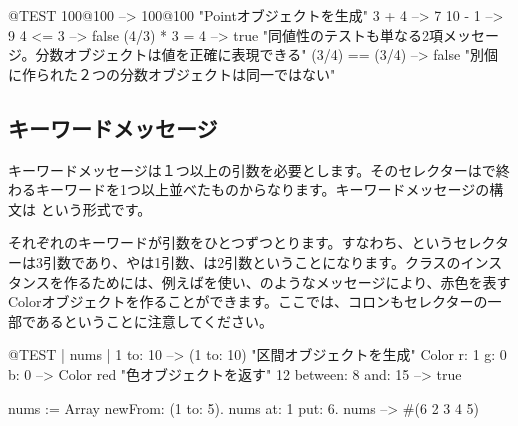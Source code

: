 \documentclass[a4paper,10pt,twoside]{book}
\begin{document}
\begin{code}{@TEST}
100@100      --> 100@100  "Pointオブジェクトを生成"
3 + 4              --> 7
10 - 1            --> 9
4 <= 3            --> false
(4/3) * 3 = 4   --> true  "同値性のテストも単なる2項メッセージ。分数オブジェクトは値を正確に表現できる"
(3/4) == (3/4) --> false  "別個に作られた２つの分数オブジェクトは同一ではない"
\end{code}


\subsection{キーワードメッセージ} 

キーワードメッセージは１つ以上の引数を必要とします。そのセレクターは\ct{:}で終わるキーワードを1つ以上並べたものからなります。キーワードメッセージの構文は
という形式です。

それぞれのキーワードが引数をひとつずつとります。すなわち、というセレクターは3引数であり、やは1引数、は2引数ということになります。クラスのインスタンスを作るためには、例えばを使い、のようなメッセージにより、赤色を表すColorオブジェクトを作ることができます。ここでは、コロンもセレクターの一部であるということに注意してください。


\begin{code}{@TEST | nums |}
1 to: 10                        --> (1 to: 10)  "区間オブジェクトを生成"
Color r: 1 g: 0 b: 0       --> Color red  "色オブジェクトを返す"
12 between: 8 and: 15 --> true

nums := Array newFrom: (1 to: 5).
nums at: 1 put: 6.
nums --> #(6 2 3 4 5)
\end{code}

\end{document}
